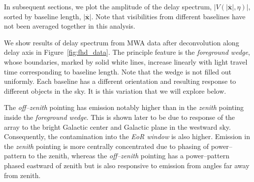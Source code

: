 \documentclass[preprint2,iop,numberedappendix]{emulateapj}
\begin{document}
In subsequent sections, we plot the amplitude of the delay spectrum, $|V(|\overline{\mathbf{x}}|,\eta)|$, sorted by baseline length, $|\overline{\mathbf{x}}|$. Note that visibilities from different baselines have not been averaged together in this analysis. 

We show results of delay spectrum from MWA data after deconvolution along delay axis in Figure~\ref{fig:fhd_data}. The principle feature is the {\it foreground wedge}, whose boundaries, marked by solid white lines, increase linearly with light travel time corresponding to baseline length. Note that the wedge is not filled out uniformly. Each baseline has a different orientation and resulting response to different objects in the sky. It is this variation that we will explore below. 

The {\it off--zenith} pointing has emission notably higher than in the {\it zenith} pointing inside the {\it foreground wedge}. This is shown later to be due to response of the array to the bright Galactic center and Galactic plane in the westward sky. Consequently, the contamination into the {\it EoR window} is also higher. Emission in the {\it zenith} pointing is more centrally concentrated due to phasing of power--pattern to the zenith, whereas the {\it off--zenith} pointing has a power--pattern phased eastward of zenith but is also responsive to emission from angles far away from zenith. 
\end{document}
